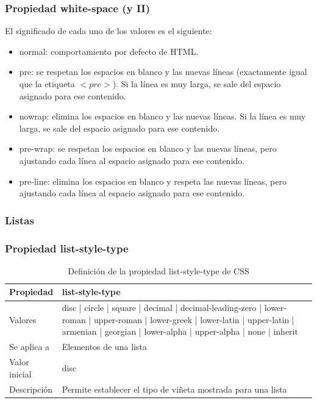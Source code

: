 \begin{frame}
\frametitle{Propiedad white-space (y II)}

El significado de cada uno de los valores es el siguiente:
\begin{itemize}
  \item normal: comportamiento por defecto de HTML.
  \item pre: se respetan los espacios en blanco y las nuevas líneas (exactamente igual que la etiqueta $<pre>$). Si la línea es muy larga, se sale del espacio asignado para ese contenido.
  \item nowrap: elimina los espacios en blanco y las nuevas líneas. Si la línea es muy larga, se sale del espacio asignado para ese contenido.
  \item pre-wrap: se respetan los espacios en blanco y las nuevas líneas, pero ajustando cada línea al espacio asignado para ese contenido.
  \item pre-line: elimina los espacios en blanco y respeta las nuevas líneas, pero ajustando cada línea al espacio asignado para ese contenido.
\end{itemize}

\end{frame}




\subsubsection*{Listas}

\begin{frame}
\frametitle{Propiedad list-style-type}

\begin{center}
  \begin{table}
   \begin{tabular}{p{1.8cm}p{7.8cm}}
Propiedad & \bf{list-style-type} \\ \hline
Valores& disc | circle | square | decimal | decimal-leading-zero | lower-roman | upper-roman | lower-greek | lower-latin | upper-latin | armenian | georgian | lower-alpha | upper-alpha | none | inherit \\ \hline
Se aplica a& Elementos de una lista \\ \hline
Valor inicial& disc \\ \hline
Descripción& Permite establecer el tipo de viñeta mostrada para una lista \\ \hline
  \end{tabular}
   \caption{Definición de la propiedad list-style-type de CSS}
 \end{table}
\end{center}


\end{frame}


